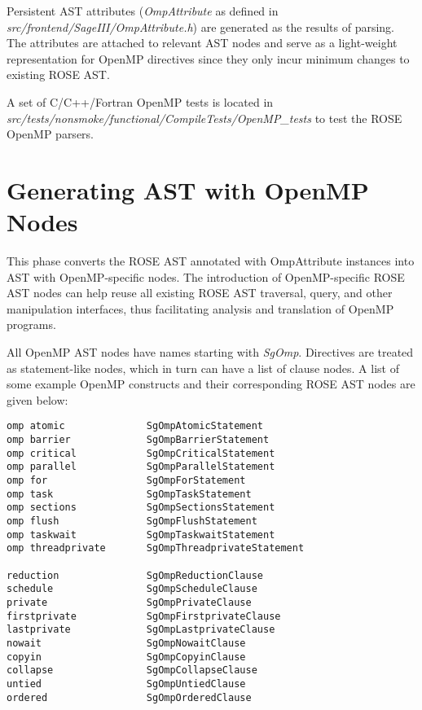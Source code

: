 Persistent AST attributes (\emph{OmpAttribute} as defined in
\textit{src/frontend/SageIII/OmpAttribute.h}) are generated as the results
of parsing.
The attributes are attached to relevant AST nodes and serve as a light-weight representation for OpenMP directives
since they only incur minimum changes to existing ROSE AST.

A set of C/C++/Fortran OpenMP tests is located in \textit{src/tests/nonsmoke/functional/CompileTests/OpenMP\_tests} to test the ROSE OpenMP parsers.
\section{Generating AST with OpenMP Nodes}
This phase converts the ROSE AST annotated with OmpAttribute instances into
AST with OpenMP-specific nodes.
The introduction of OpenMP-specific ROSE AST nodes can help reuse all
existing ROSE AST traversal, query, and other manipulation interfaces, thus
facilitating analysis and translation of OpenMP programs.

All OpenMP AST nodes have names starting with \textit{SgOmp}. 
Directives are treated as statement-like nodes, which in turn can have a list of clause nodes.
A list of some example OpenMP constructs and their corresponding ROSE AST nodes are given below:

{\scriptsize
\begin{verbatim}
omp atomic              SgOmpAtomicStatement
omp barrier             SgOmpBarrierStatement
omp critical            SgOmpCriticalStatement
omp parallel            SgOmpParallelStatement
omp for                 SgOmpForStatement
omp task                SgOmpTaskStatement
omp sections            SgOmpSectionsStatement
omp flush               SgOmpFlushStatement
omp taskwait            SgOmpTaskwaitStatement
omp threadprivate       SgOmpThreadprivateStatement

reduction               SgOmpReductionClause
schedule                SgOmpScheduleClause
private                 SgOmpPrivateClause
firstprivate            SgOmpFirstprivateClause
lastprivate             SgOmpLastprivateClause
nowait                  SgOmpNowaitClause
copyin                  SgOmpCopyinClause
collapse                SgOmpCollapseClause
untied                  SgOmpUntiedClause
ordered                 SgOmpOrderedClause
\end{verbatim}
}
 
